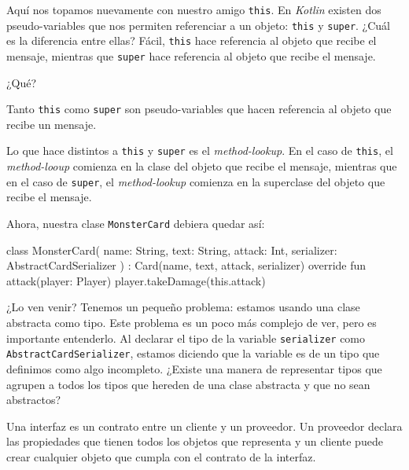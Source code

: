   Aquí nos topamos nuevamente con nuestro amigo \texttt{this}.
  En \textit{Kotlin} existen dos pseudo-variables que nos permiten referenciar a un objeto: 
  \texttt{this} y \texttt{super}.
  ¿Cuál es la diferencia entre ellas?
  Fácil, \texttt{this} hace referencia al objeto que recibe el mensaje, mientras que \texttt{super}
  hace referencia al objeto que recibe el mensaje.

  \begin{center}
    ¿Qué?
  \end{center}

  \begin{defaultbox}
    Tanto \texttt{this} como \texttt{super} son pseudo-variables que hacen referencia al objeto que
    recibe un mensaje.

    Lo que hace distintos a \texttt{this} y \texttt{super} es el \textit{method-lookup}.
    En el caso de \texttt{this}, el \textit{method-looup} comienza en la clase del objeto que 
    recibe el mensaje, mientras que en el caso de \texttt{super}, el \textit{method-lookup} comienza 
    en la superclase del objeto que recibe el mensaje.
  \end{defaultbox}

  Ahora, nuestra clase \texttt{MonsterCard} debiera quedar así:

  \begin{kotlin}
    class MonsterCard(
      name: String,
      text: String,
      attack: Int,
      serializer: AbstractCardSerializer
    ) : Card(name, text, attack, serializer) {
      override fun attack(player: Player) {
        player.takeDamage(this.attack)
      }
    }
  \end{kotlin}

  ¿Lo ven venir?
  Tenemos un pequeño problema: estamos usando una clase abstracta como tipo.
  Este problema es un poco más complejo de ver, pero es importante entenderlo.
  Al declarar el tipo de la variable \texttt{serializer} como \texttt{AbstractCardSerializer},
  estamos diciendo que la variable es de un tipo que definimos como algo incompleto.
  ¿Existe una manera de representar tipos que agrupen a todos los tipos que hereden de una clase
  abstracta y que no sean abstractos?

  \begin{defaultbox}[Interfaces]
    Una interfaz es un contrato entre un cliente y un proveedor.
    Un proveedor declara las propiedades que tienen todos los objetos que representa y un cliente
    puede crear cualquier objeto que cumpla con el contrato de la interfaz.
  \end{defaultbox}

